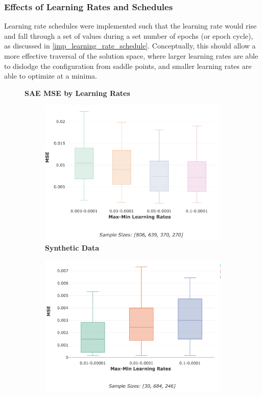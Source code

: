 \documentclass[a4paper,11pt,oneside]{article}
\theoremstyle{plain}
\theoremstyle{definition}
\begin{document}
\subsubsection{Effects of Learning Rates and Schedules}\label{results_lr}

Learning rate schedules were implemented such that the learning rate would rise and fall through a set of values during a set number of epochs (or epoch cycle), as discussed in \ref{imp_learning_rate_schedule}.	Conceptually, this should allow a more effective traversal of the solution space, where larger learning rates are able to dislodge the configuration from saddle points, and smaller learning rates are able to optimize at a minima. \newline


\begin{figure}[H]
	\centering
	\textbf{SAE MSE by Learning Rates}
	\begin{subfigure}{.5\textwidth}
		\centering 
		\includegraphics[scale=0.3]{images/results/network/lr/synth_mse_minmax_lr.png}
		\caption{\textbf{Synthetic Data} 
			\newline }
		\label{figure-synth_mse_minmax_lr}
	\end{subfigure}%
	\begin{subfigure}{.5\textwidth}
		\centering 
		\includegraphics[scale=0.3]{images/results/network/lr/actual_mse_minmax_lr.png}

\end{subfigure}
\end{figure}
\end{document}
